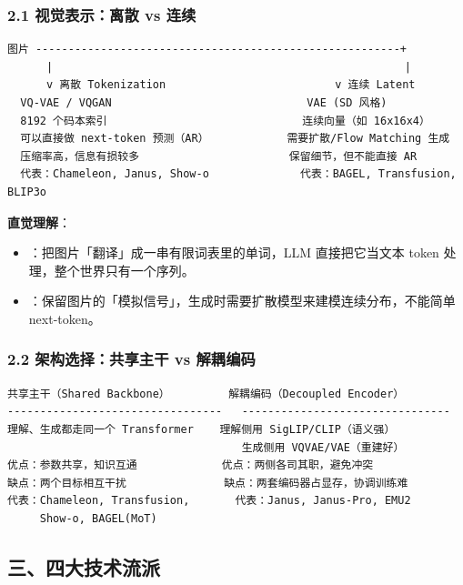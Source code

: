 \subsubsection{2.1 视觉表示：离散 vs 连续}

\begin{lstlisting}
图片 --------------------------------------------------------+
      |                                                      |
      v 离散 Tokenization                          v 连续 Latent
  VQ-VAE / VQGAN                              VAE (SD 风格)
  8192 个码本索引                              连续向量（如 16x16x4）
  可以直接做 next-token 预测（AR）            需要扩散/Flow Matching 生成
  压缩率高，信息有损较多                       保留细节，但不能直接 AR
  代表：Chameleon, Janus, Show-o              代表：BAGEL, Transfusion, BLIP3o
\end{lstlisting}

\begin{conceptbox}
\textbf{直觉理解}：
\begin{itemize}
  \item {}：把图片「翻译」成一串有限词表里的单词，LLM 直接把它当文本 token 处理，整个世界只有一个序列。
  \item {}：保留图片的「模拟信号」，生成时需要扩散模型来建模连续分布，不能简单 next-token。
\end{itemize}
\end{conceptbox}

\subsubsection{2.2 架构选择：共享主干 vs 解耦编码}

\begin{lstlisting}
共享主干（Shared Backbone）         解耦编码（Decoupled Encoder）
---------------------------------   --------------------------------
理解、生成都走同一个 Transformer    理解侧用 SigLIP/CLIP（语义强）
                                    生成侧用 VQVAE/VAE（重建好）
优点：参数共享，知识互通             优点：两侧各司其职，避免冲突
缺点：两个目标相互干扰               缺点：两套编码器占显存，协调训练难
代表：Chameleon, Transfusion,       代表：Janus, Janus-Pro, EMU2
     Show-o, BAGEL(MoT)
\end{lstlisting}

\subsection{三、四大技术流派}

